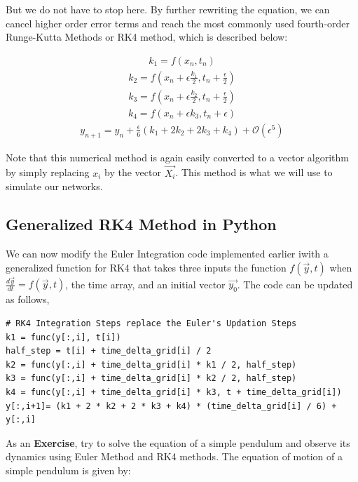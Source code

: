 \documentclass[10pt,letterpaper]{article}
\begin{document}
But we do not have to stop here. By further rewriting the equation, we can cancel higher order error terms and reach the most commonly used fourth-order Runge-Kutta Methods or RK4 method, which is described below:

\begin{eqnarray}k_1=f(x_n,t_n)\end{eqnarray}
\begin{eqnarray}k_2=f(x_n+\epsilon\frac{k_1}{2},t_n+\frac{\epsilon}{2})\end{eqnarray}
\begin{eqnarray}k_3=f(x_n+\epsilon\frac{k_2}{2},t_n+\frac{\epsilon}{2})\end{eqnarray}
\begin{eqnarray}k_4=f(x_n+\epsilon k_3,t_n+\epsilon)\end{eqnarray}
\begin{eqnarray}y_{n+1}=y_n+\frac{\epsilon}{6}(k_1+2 k_2+2 k_3+k_4)+\mathcal{O}(\epsilon^5)\end{eqnarray}

Note that this numerical method is again easily converted to a vector algorithm by simply replacing $x_i$ by the vector $\vec{X_i}$. This method is what we will use to simulate our networks.


\subsection*{Generalized RK4 Method in Python}

We can now modify the Euler Integration code implemented earlier iwith a generalized function for RK4 that takes three inputs \textemdash the function $f(\vec{y},t)$ when $\frac{d\vec{y}}{dt}=f(\vec{y},t)$, the time array, and an initial vector $\vec{y_0}$. The code can be updated as follows,

\begin{verbatim}
# RK4 Integration Steps replace the Euler's Updation Steps
k1 = func(y[:,i], t[i])                               
half_step = t[i] + time_delta_grid[i] / 2
k2 = func(y[:,i] + time_delta_grid[i] * k1 / 2, half_step)
k3 = func(y[:,i] + time_delta_grid[i] * k2 / 2, half_step)
k4 = func(y[:,i] + time_delta_grid[i] * k3, t + time_delta_grid[i])
y[:,i+1]= (k1 + 2 * k2 + 2 * k3 + k4) * (time_delta_grid[i] / 6) + y[:,i]
\end{verbatim}

As an \textbf{Exercise}, try to solve the equation of a simple pendulum and observe its dynamics using Euler Method and RK4 methods. The equation of motion of a simple pendulum is given by: 
\end{document}
